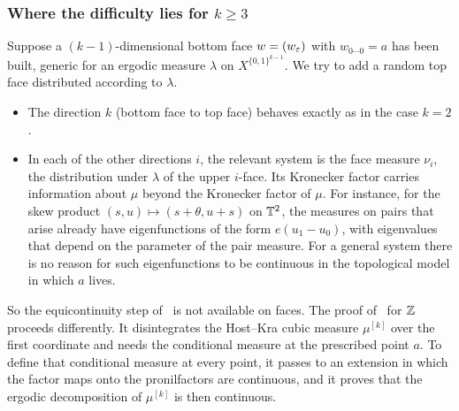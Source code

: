 \subsubsection*{Where the difficulty lies for $k\ge3$}
Suppose a $(k-1)$-dimensional bottom face $w=(w_\varepsilon)$ with $w_{0\cdots0}=a$ has been
built, generic for an ergodic measure $\lambda$ on $X^{\{0,1\}^{k-1}}$. We try to add a
random top face distributed according to $\lambda$.
\begin{itemize}
\item The direction $k$ (bottom face to top face) behaves exactly as in the case $k=2$.
\item In each of the other directions $i$, the relevant system is the face measure $\nu_i$,
the distribution under $\lambda$ of the upper $i$-face. Its Kronecker factor carries
information about $\mu$ beyond the Kronecker factor of $\mu$. For instance, for the skew
product $(s,u)\mapsto(s+\theta,u+s)$ on $\mathbb{T}^2$, the measures on pairs that arise already
have eigenfunctions of the form $e(u_1-u_0)$, with eigenvalues that depend on the
parameter of the pair measure. For a general system there is no reason for such
eigenfunctions to be continuous in the topological model in which $a$ lives.
\end{itemize}
So the equicontinuity step of~\cite{kra2026short} is not available on faces.
The proof of~\cite{kra2022infinite} for $\mathbb{Z}$ proceeds differently. It disintegrates the
Host--Kra cubic measure $\mu^{[k]}$ over the first coordinate and needs the conditional
measure at the prescribed point $a$. To define that conditional measure at every point,
it passes to an extension in which the factor maps onto the pronilfactors are continuous,
and it proves that the ergodic decomposition of $\mu^{[k]}$ is then continuous.

